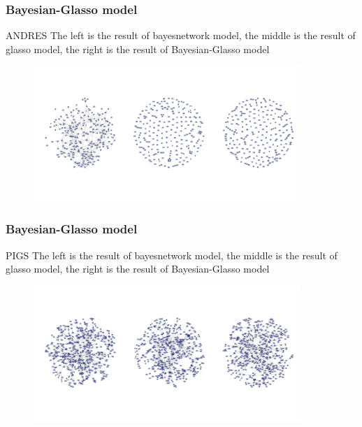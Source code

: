 \documentclass{beamer}
\begin{document}
\begin{frame}
\frametitle{Bayesian-Glasso model}
  \begin{block}{ANDRES}
  The left is the result of bayesnetwork model, the middle is the result of glasso model, the right is the result of Bayesian-Glasso model
 \begin{center}
 \begin{figure}
     \includegraphics[width=0.9\textwidth, height=0.7\textheight]{andres.jpeg}

    \end{figure}
\end{center}
  \end{block}


\end{frame}
\begin{frame}
\frametitle{Bayesian-Glasso model}
  \begin{block}{PIGS}
  The left is the result of bayesnetwork model, the middle is the result of glasso model, the right is the result of Bayesian-Glasso model
 \begin{center}
 \begin{figure}
     \includegraphics[width=0.9\textwidth, height=0.7\textheight]{pigs.jpeg}

    \end{figure}
\end{center}
  \end{block}


\end{frame}
\end{document}
